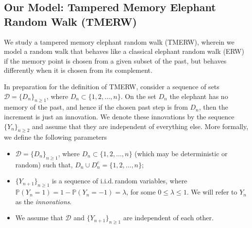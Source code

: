 \documentclass{article}
\numberwithin{equation}{section}
\newcommand{\1}{\mathbf{1}}
\newcommand{\0}{\mathbf{0}}
\newcommand{\PP}{\mbox{${\mathbb P}$}}
\begin{document}
\subsection
{Our Model: Tampered Memory Elephant Random Walk (TMERW)}
\label{SubSec: TMERW}
We study a tampered memory elephant random walk (TMERW), wherein we model a random walk that behaves like a classical elephant random walk (ERW) if the memory point is chosen from a given subset of the past, but behaves differently when it is chosen from its complement. 

In preparation for the definition of TMERW, consider a sequence of sets $\mathcal{D} = \{ D_n \}_{n \geq 1}$, where $D_n \subset \{1, 2, \dots, n\}$. On the set $D_n$ the elephant has no memory of the past, and hence if the chosen past step is from $D_n$, then the increment is just an innovation. We denote these innovations by the sequence $\{Y_n\}_{n \ge 2}$ and assume that they are independent of everything else. More formally, we define  the following parameters
\begin{itemize}
\item $\mathcal{D} = \{ D_n \}_{n \geq 1}$, where $D_n \subset \{1, 2, \dots, n\}$ (which may be deterministic or random) such that, $D_n \cup D_n^c = \{1,2, \ldots, n\}$;
\item $\{Y_{n+1}\}_{n \ge 1}$ is a sequence of i.i.d.\,random variables, where $\PP\left(Y_n=1\right)=1-\PP\left( Y_n =-1\right)=\lambda$, for some $0 \le \lambda \le 1$. We will refer to $Y_n$ as the \textit{innovations}.
\item We assume that $\mathcal{D}$ and $\{Y_{n+1}\}_{n \ge 1}$ are independent of each other.
\end{itemize}
\end{document}
